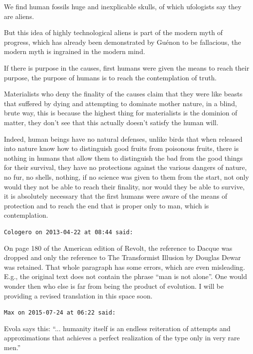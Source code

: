 \begin{footnotesize}
\begin{sffamily}
We find human fossils huge and inexplicable skulls, of which ufologists say they are aliens.

But this idea of highly technological aliens is part of the modern myth of progress, which has already been demonstrated by Guénon to be fallacious, the modern myth is ingrained in the modern mind.

If there is purpose in the causes, first humans were given the means to reach their purpose, the purpose of humans is to reach the contemplation of truth.

Materialists who deny the finality of the causes claim that they were like beasts that suffered by dying and attempting to dominate mother nature, in a blind, brute way, this is because the highest thing for materialists is the dominion of matter, they don't see that this actually doesn't satisfy the human will.

Indeed, human beings have no natural defenses, unlike birds that when released into nature know how to distinguish good fruits from poisonous fruits, there is nothing in humans that allow them to distinguish the bad from the good things for their survival, they have no protections against the various dangers of nature, no fur, no shells, nothing, if no science was given to them from the start, not only would they not be able to reach their finality, nor would they be able to survive, it is absolutely necessary that the first humans were aware of the means of protection and to reach the end that is proper only to man, which is contemplation.

\hfill

\texttt{Cologero on 2013-04-22 at 08:44 said:}

On page 180 of the American edition of Revolt, the reference to Dacque was dropped and only the reference to The Transformist Illusion by Douglas Dewar was retained. That whole paragraph has some errors, which are even misleading. E.g., the original text does not contain the phrase ``man is not alone''. One would wonder then who else is far from being the product of evolution. I will be providing a revised translation in this space soon.

\hfill

\texttt{Max on 2015-07-24 at 06:22 said:}

Evola says this: ``... humanity itself is an endless reiteration of attempts and approximations that achieves a perfect realization of the type only in very rare men.''


\end{sffamily}
\end{footnotesize}
